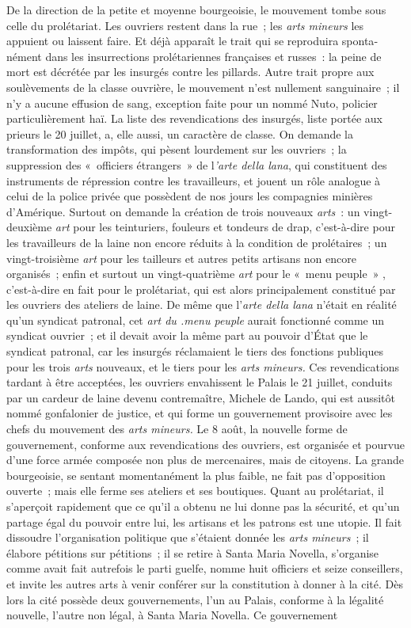 \documentclass[french,twoside]{book} %
\begin{document}
De la direction de la petite et moyenne bourgeoisie, le mouvement tombe sous celle du prolétariat. Les ouvriers restent dans la rue ; les {\itshape arts mineurs} les appuient ou laissent faire. Et déjà apparaît le trait qui se reproduira sponta­nément dans les insurrections prolétariennes françaises et russes : la peine de mort est décrétée par les insurgés contre les pillards. Autre trait propre aux soulèvements de la classe ouvrière, le mouvement n'est nullement sangui­naire ; il n'y a aucune effusion de sang, exception faite pour un nommé Nuto, policier particulièrement haï. La liste des revendications des insurgés, liste portée aux prieurs le 20 juillet, a, elle aussi, un caractère de classe. On deman­de la transformation des impôts, qui pèsent lourdement sur les ouvriers ; la suppression des « officiers étrangers » de l{\itshape 'arte della lana}, qui constituent des instruments de répression contre les travailleurs, et jouent un rôle analogue à celui de la police privée que possèdent de nos jours les compagnies minières d'Amérique. Surtout on demande la création de trois nouveaux {\itshape arts} : un vingt-deuxième {\itshape art} pour les teinturiers, fouleurs et tondeurs de drap, c'est-à-dire pour les travailleurs de la laine non encore réduits à la condition de prolé­taires ; un vingt-troisième {\itshape art} pour les tailleurs et autres petits artisans non encore organisés ; enfin et surtout un vingt-quatrième {\itshape art} pour le « menu peuple » , c'est-à-dire en fait pour le prolétariat, qui est alors principalement constitué par les ouvriers des ateliers de laine. De même que l'{\itshape arte della lana} n'était en réalité qu'un syndicat patronal, cet {\itshape art du .menu peuple} aurait fonctionné comme un syndicat ouvrier ; et il devait avoir la même part au pouvoir d'État que le syndicat patronal, car les insurgés réclamaient le tiers des fonctions publiques pour les trois {\itshape arts} nouveaux, et le tiers pour les {\itshape arts mineurs.} Ces revendications tardant à être acceptées, les ouvriers envahissent le Palais le 21 juillet, conduits par un cardeur de laine devenu contremaître, Michele de Lando, qui est aussitôt nommé gonfalonier de justice, et qui forme un gouvernement provisoire avec les chefs du mouvement des {\itshape arts mineurs.} Le 8 août, la nouvelle forme de gouvernement, conforme aux revendications des ouvriers, est organisée et pourvue d'une force armée composée non plus de mercenaires, mais de citoyens. La grande bourgeoisie, se sentant momen­tanément la plus faible, ne fait pas d'opposition ouverte ; mais elle ferme ses ateliers et ses boutiques. Quant au prolétariat, il s'aperçoit rapidement que ce qu'il a obtenu ne lui donne pas la sécurité, et qu'un partage égal du pouvoir entre lui, les artisans et les patrons est une utopie. Il fait dissoudre l'organi­sation politique que s'étaient donnée les {\itshape arts mineurs} ; il élabore pétitions sur pétitions ; il se retire à Santa Maria Novella, s'organise comme avait fait autrefois le parti guelfe, nomme huit officiers et seize conseillers, et invite les autres arts à venir conférer sur la constitution à donner à la cité. Dès lors la cité possède deux gouvernements, l'un au Palais, conforme à la légalité nou­velle, l'autre non légal, à Santa Maria Novella. Ce gouvernement 
\end{document}
